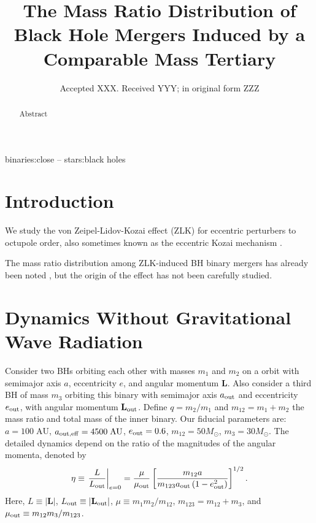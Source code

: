 \documentclass[
        fleqn,
        usenatbib,
    ]{mnras}
\title[Mass Ratio Distribution]{The Mass Ratio Distribution of
Black Hole Mergers Induced by a Comparable Mass Tertiary}
\date{Accepted XXX\@. Received YYY\@; in original form ZZZ}
\newcommand*{\at}[1]{\left.#1\right|}
\newcommand*{\abs}[1]{\left|#1\right|}
\newcommand*{\p}[1]{\left(#1\right)}
\newcommand*{\s}[1]{\left[#1\right]}
\newcommand*{\bm}[1]{\mathbf{#1}}
\begin{document}
\label{firstpage}
\pagerange{\pageref{firstpage}--\pageref{lastpage}}
\maketitle

\begin{abstract}
    Abstract
\end{abstract}

\begin{keywords}
binaries:close -- stars:black holes %
\end{keywords}


\section{Introduction}\label{s:intro}

We study the von Zeipel-Lidov-Kozai effect (ZLK) for eccentric perturbers to
octupole order, also sometimes known as the eccentric Kozai mechanism
\citep[e.g.][]{lithwick2011eccentric}.

The mass ratio distribution among ZLK-induced BH binary mergers has already been
noted \citep[see Fig.~10 of][]{silsbee2017lidov}, but the origin of the effect
has not been carefully studied.

\section{Dynamics Without Gravitational Wave Radiation}\label{s:background}

Consider two BHs orbiting each other with masses $m_1$ and $m_2$ on a orbit with
semimajor axis $a$, eccentricity $e$, and angular momentum $\bm{L}$. Also
consider a third BH of mass $m_3$ orbiting this binary with semimajor axis
$a_{\rm out}$ and eccentricity $e_{\rm out}$, with angular momentum $\bm{L}_{\rm
out}$. Define $q = m_2 / m_1$ and $m_{12} = m_1 + m_2$ the mass ratio and total
mass of the inner binary. Our fiducial parameters are: $a = 100\;\mathrm{AU}$,
$a_{\rm out, eff} = 4500\;\mathrm{AU}$, $e_{\rm out} = 0.6$, $m_{12} =
50M_{\odot}$, $m_3 = 30M_{\odot}$. The detailed dynamics depend on the ratio of
the magnitudes of the angular momenta, denoted by
\begin{equation}
    \eta \equiv \at{\frac{L}{L_{\rm out}}}_{e = 0}
        = \frac{\mu}{\mu_{\rm out}}\s{\frac{m_{12}a}
            {m_{123}a_{\rm out}\p{1 - e_{\rm out}^2}}}^{1/2}.\label{eq:def_eta}
\end{equation}
Here, $L \equiv \abs{\bm{L}}$, $L_{\rm out} \equiv \abs{\bm{L}_{\rm out}}$, $\mu
\equiv m_1m_2 / m_{12}$, $m_{123} = m_{12} + m_3$, and $\mu_{\rm out} \equiv
m_{12} m_3 / m_{123}$.
\end{document}
